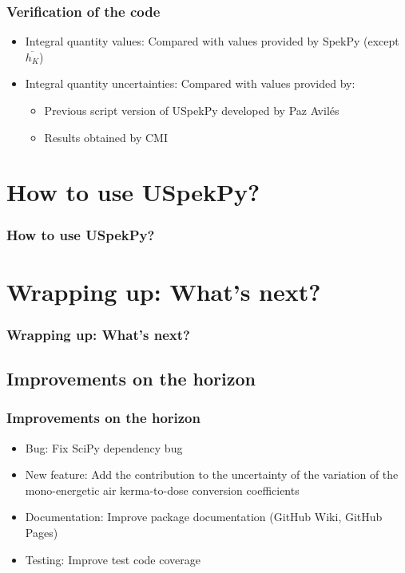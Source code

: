\documentclass{beamer}
\newcommand{\highlight}[1]{{\color{blue} #1}}
\begin{document}
	\begin{frame}
		\frametitle{Verification of the code}
		\begin{itemize}
			\setlength\itemsep{2em}
			\item Integral quantity \highlight{values}: Compared with values provided by SpekPy (except $\overline{h_K}$)
			\item Integral quantity \highlight{uncertainties}: Compared with values provided by:
			\begin{itemize}
				\setlength\itemsep{1em}
				\item Previous script version of USpekPy developed by Paz Avilés
				\item Results obtained by CMI
			\end{itemize}
		\end{itemize}
	\end{frame}
	
	\section{How to use USpekPy?}
	
	\begin{frame}
		\frametitle{How to use USpekPy?}
		\tableofcontents[
		currentsection,
		sectionstyle=show/shaded,
		subsectionstyle=show/show/hide
		]
	\end{frame}
	
	\section{Wrapping up: What’s next?}
		
	\begin{frame}
		\frametitle{Wrapping up: What’s next?}
		\tableofcontents[
		currentsection,
		sectionstyle=show/shaded,
		subsectionstyle=show/show/hide
		]
	\end{frame}
	
	\subsection{Improvements on the horizon}
	
	\begin{frame}
		\frametitle{Improvements on the horizon}
		\begin{itemize}
			\setlength\itemsep{1em}
			\item \highlight{Bug}: Fix SciPy dependency bug
			\item \highlight{New feature}: Add the contribution to the \highlight{uncertainty} of the variation of the mono-energetic air kerma-to-dose conversion coefficients
			\item \highlight{Documentation}: Improve package documentation (GitHub Wiki, GitHub Pages)
			\item \highlight{Testing}: Improve test code coverage
		\end{itemize}			
	\end{frame}
	
\end{document}
